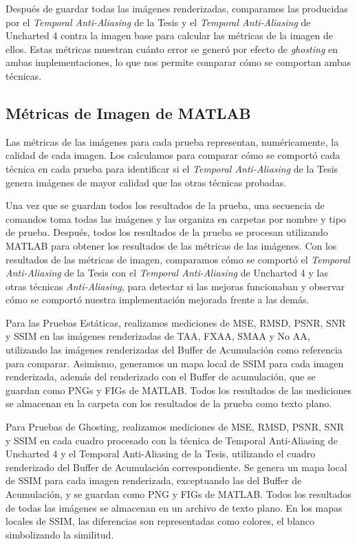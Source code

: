 \documentclass[pregrado]{tesis-usb} %
\begin{document}
Después de guardar todas las imágenes renderizadas, comparamos las producidas por el \textit{Temporal Anti-Aliasing} de la Tesis y el \textit{Temporal Anti-Aliasing} de Uncharted 4 contra la imagen base para calcular las métricas de la imagen de ellos. Estas métricas muestran cuánto error se generó por efecto de \textit{ghosting} en ambas implementaciones, lo que nos permite comparar cómo se comportan ambas técnicas. 


\subsection{Métricas de Imagen de MATLAB}
Las métricas de las imágenes para cada prueba representan, numéricamente, la calidad de cada imagen. Los calculamos para comparar cómo se comportó cada técnica en cada prueba para identificar si el \textit{Temporal Anti-Aliasing} de la Tesis genera imágenes de mayor calidad que las otras técnicas probadas.

Una vez que se guardan todos los resultados de la prueba, una secuencia de comandos toma todas las imágenes y las organiza en carpetas por nombre y tipo de prueba. Después, todos los resultados de la prueba se procesan utilizando MATLAB para obtener los resultados de las métricas de las imágenes. Con los resultados de las métricas de imagen, comparamos cómo se comportó el \textit{Temporal Anti-Aliasing} de la Tesis con el \textit{Temporal Anti-Aliasing} de Uncharted 4 y las otras técnicas \textit{Anti-Aliasing}, para detectar si las mejoras funcionaban y observar cómo se comportó nuestra implementación mejorada frente a las demás.

Para las Pruebas Estáticas, realizamos mediciones de MSE, RMSD, PSNR, SNR y SSIM en las imágenes renderizadas de TAA, FXAA, SMAA y No AA, utilizando las imágenes renderizadas del Buffer de Acumulación como referencia para comparar. Asimismo, generamos un mapa local de SSIM para cada imagen renderizada, además del renderizado con el Buffer de acumulación, que se guardan como PNGs y FIGs de MATLAB. Todos los resultados de las mediciones se almacenan en la carpeta con los resultados de la prueba como texto plano.

Para Pruebas de Ghosting, realizamos mediciones de MSE, RMSD, PSNR, SNR y SSIM en cada cuadro procesado con la técnica de Temporal Anti-Aliasing de Uncharted 4 y el Temporal Anti-Aliasing de la Tesis, utilizando el cuadro renderizado del Buffer de Acumulación correspondiente. Se genera un mapa local de SSIM para cada imagen renderizada, exceptuando las del Buffer de Acumulación, y se guardan como PNG y FIGs de MATLAB. Todos los resultados de todas las imágenes se almacenan en un archivo de texto plano. En los mapas locales de SSIM, las diferencias son representadas como colores, el blanco simbolizando la similitud.
\end{document}
